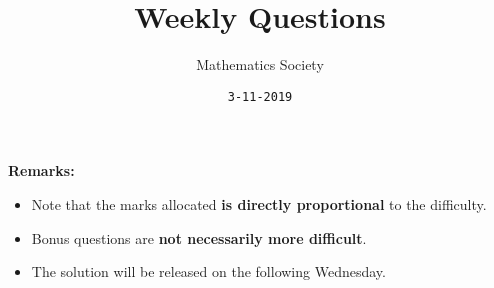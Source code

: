 \documentclass[addpoints]{exam}
\title{Weekly Questions}
\author{Mathematics Society}
\date{\texttt{3-11-2019}}
\begin{document}


\maketitle



\textbf{Remarks:}
\begin{itemize}
    \item Note that the marks allocated \textbf{is directly proportional} to the difficulty.
    \item Bonus questions are \textbf{not necessarily more difficult}.
    \item The solution will be released on the following Wednesday.
\end{itemize}





\end{document}
